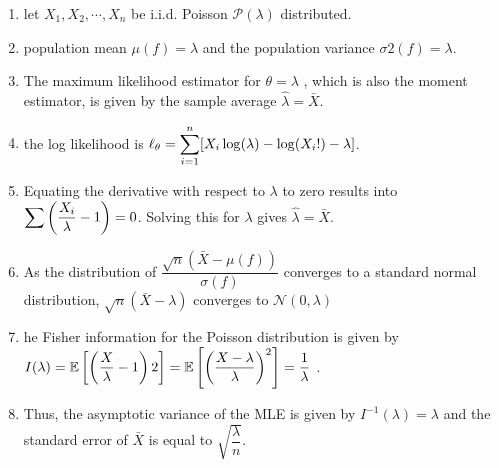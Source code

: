 \begin{enumerate}
    \item let $X_1 , X_2, \cdots , X_n$ be i.i.d. Poisson $\mathcal{P}(\lambda)$ distributed. 
    \hfill \cite{statistics/book/Statistics-for-Data-Scientists/Maurits-Kaptein}

    \item population mean $\mu ( f ) = \lambda $ and the population variance $\sigma 2( f ) = \lambda $. 
    \hfill \cite{statistics/book/Statistics-for-Data-Scientists/Maurits-Kaptein}

    \item The maximum likelihood estimator for $\theta = \lambda$ , which is also the moment estimator, is given by the sample average $\hat{\lambda} = \bar{X}$. 
    \hfill \cite{statistics/book/Statistics-for-Data-Scientists/Maurits-Kaptein}

    \item  the log likelihood is $\ell _\theta = \displaystyle\sum^n _{i=1}[X_i \log(\lambda ) - \log(X_i !) - \lambda ]$. 
    \hfill \cite{statistics/book/Statistics-for-Data-Scientists/Maurits-Kaptein}

    \item Equating the derivative with respect to $\lambda $ to zero results into $\displaystyle\sum \left(\dfrac{X_i}{\lambda} - 1\right) = 0$. 
    Solving this for $\lambda $ gives $\hat{\lambda} = \bar{X}$.
    \hfill \cite{statistics/book/Statistics-for-Data-Scientists/Maurits-Kaptein}

    \item As the distribution of $\dfrac{\sqrt{n}( \bar{X} - \mu ( f ))}{\sigma ( f )}$ converges to a standard normal distribution, $\sqrt{n}( \bar{X} - \lambda )$ converges to $\mathcal{N} (0, \lambda )$
    \hfill \cite{statistics/book/Statistics-for-Data-Scientists/Maurits-Kaptein}

    \item he Fisher information for the Poisson distribution is given by $I (\lambda ) = \mathbb{E}\left[\left(\dfrac{X}{\lambda} - 1\right)2\right]=  \mathbb{E}\left[\left(\dfrac{X - \lambda}{\lambda}\right)^2\right] = \dfrac{1}{\lambda} $ .
    \hfill \cite{statistics/book/Statistics-for-Data-Scientists/Maurits-Kaptein}

    \item Thus, the asymptotic variance of the MLE is given by $I ^{-1}(\lambda ) = \lambda $ and the standard error of $\bar{X}$ is equal to $\sqrt{\dfrac{\lambda}{n}}$.
    \hfill \cite{statistics/book/Statistics-for-Data-Scientists/Maurits-Kaptein}
\end{enumerate}












